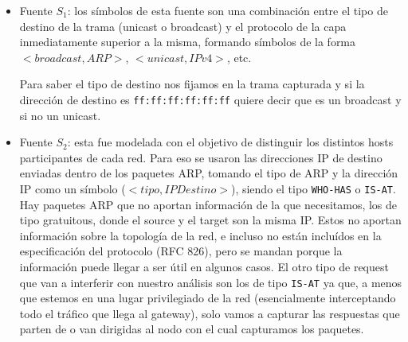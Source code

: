 \begin{itemize}

  \item Fuente $S_1$: los símbolos de esta fuente son una combinación entre el tipo de destino de la trama (unicast o broadcast) y el protocolo de la capa inmediatamente superior a la misma, formando símbolos de la forma $<broadcast, ARP>$, $<unicast, IPv4>$, etc.
  
  Para saber el tipo de destino nos fijamos en la trama capturada y si la dirección de destino es \texttt{ff:ff:ff:ff:ff:ff} quiere decir que es un broadcast y si no un unicast.
  
  \item Fuente $S_2$: esta fue modelada con el objetivo de distinguir los distintos hosts participantes de cada red. Para eso se usaron las direcciones IP de destino enviadas dentro de los paquetes ARP, tomando el tipo de ARP y la dirección IP  como un símbolo ($<tipo, IPDestino>$), siendo el tipo \texttt{WHO-HAS} o \texttt{IS-AT}. Hay paquetes ARP que no aportan información de la que necesitamos, los de tipo gratuitous, donde el source y el target son la misma IP. Estos no aportan información sobre la topología de la red, e incluso no están incluídos en la especificación del protocolo (RFC 826), pero se mandan porque la información puede llegar a ser útil en algunos casos. El otro tipo de request que van a interferir con nuestro análisis son los de tipo \texttt{IS-AT} ya que, a menos que estemos en una lugar privilegiado de la red (esencialmente interceptando todo el tráfico que llega al gateway), solo vamos a capturar las respuestas que parten de o van dirigidas al nodo con el cual capturamos los paquetes.

\end{itemize}


